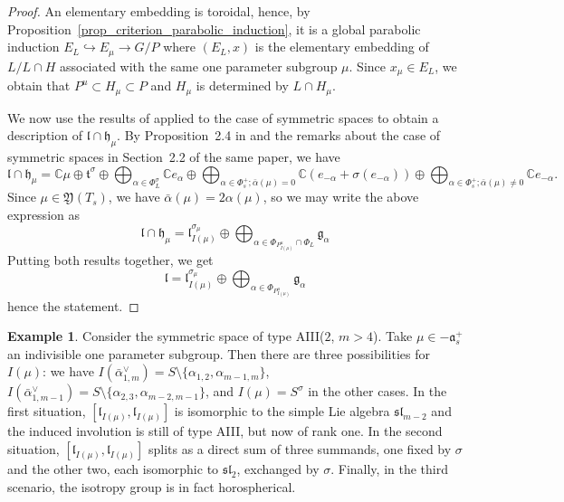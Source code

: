 \documentclass{amsart}
\theoremstyle{definition}
\newtheorem{exa}[thm]{Example}
\begin{document}
\begin{proof}
An elementary embedding is toroidal, hence, 
by Proposition~\ref{prop_criterion_parabolic_induction}, it is a global parabolic induction 
$E_L \hookrightarrow E_{\mu}\rightarrow G/P$ where $(E_L,x)$ is the elementary 
embedding of $L/L\cap H$ associated with the same one parameter subgroup $\mu$.
Since $x_{\mu} \in E_L$, we obtain that $P^u\subset H_{\mu}\subset P$ and 
$H_{\mu}$ is determined by $L\cap H_{\mu}$. 

We now use the results of \cite{Bri90} applied to the case of symmetric spaces 
to obtain a description of $\mathfrak{l}\cap \mathfrak{h}_{\mu}$.
By Proposition~2.4 in \cite{Bri90} and the remarks about the case of 
symmetric spaces in Section~2.2 of the same paper, we have 
\[
\mathfrak{l}\cap \mathfrak{h}_{\mu} = 
\mathbb{C}\mu\oplus \mathfrak{t}^{\sigma} \oplus 
\bigoplus_{\alpha\in \Phi_L^{\sigma}} \mathbb{C}e_{\alpha}
\oplus \bigoplus_{\alpha\in \Phi_s^+; \bar{\alpha}(\mu)=0}\mathbb{C}(e_{-\alpha}+\sigma(e_{-\alpha}))
\oplus \bigoplus_{\alpha\in \Phi_s^+; \bar{\alpha}(\mu)\neq 0}\mathbb{C}e_{-\alpha}.
\]
Since $\mu\in \mathfrak{Y}(T_s)$, we have $\bar{\alpha}(\mu)=2\alpha(\mu)$, so we may write 
the above expression as 
\[
\mathfrak{l}\cap \mathfrak{h}_{\mu} = 
\mathfrak{l}_{I(\mu)}^{\sigma_{\mu}}\oplus \bigoplus_{\alpha\in \Phi_{P_{I(\mu)}^u}\cap \Phi_L}\mathfrak{g}_{\alpha}
\]
Putting both results together, we get 
\[
\mathfrak{l} = 
\mathfrak{l}_{I(\mu)}^{\sigma_{\mu}}\oplus \bigoplus_{\alpha\in \Phi_{P_{I(\mu)}^u}}\mathfrak{g}_{\alpha}
\]
hence the statement.
\end{proof}

\begin{exa}
\label{exa_facets_AIII}
Consider the symmetric space of type AIII($2$, $m>4$). 
Take $\mu \in -\mathfrak{a}_s^+$ an indivisible one parameter subgroup. Then 
there are three possibilities for $I(\mu)$: we have 
$I(\bar{\alpha}_{1,m}^{\vee})=S\setminus\{\alpha_{1,2},\alpha_{m-1,m}\}$, 
$I(\bar{\alpha}_{1,m-1}^{\vee})=S\setminus\{\alpha_{2,3},\alpha_{m-2,m-1}\}$, 
and $I(\mu)=S^{\sigma}$ in the other cases. 
In the first situation, $[\mathfrak{l}_{I(\mu)},\mathfrak{l}_{I(\mu)}]$ is 
isomorphic to the simple Lie algebra $\mathfrak{sl}_{m-2}$ and the induced 
involution is still of type AIII, but now of rank one. 
In the second situation, $[\mathfrak{l}_{I(\mu)},\mathfrak{l}_{I(\mu)}]$ splits 
as a direct sum of three summands, one fixed by $\sigma$ and the other two, 
each isomorphic to $\mathfrak{sl}_2$, exchanged by $\sigma$. 
Finally, in the third scenario, the isotropy group is in fact horospherical.
\end{exa}
\end{document}
